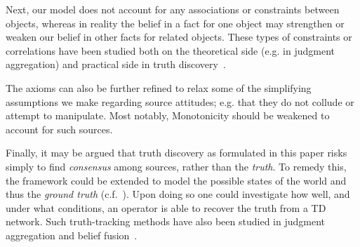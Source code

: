 Next, our model does not account for any associations or constraints between
objects, whereas in reality the belief in a fact for one object may strengthen
or weaken our belief in other facts for related objects. These types of
constraints or correlations have been studied both on the theoretical side
(e.g. in judgment aggregation) and practical side in truth
discovery~\cite{yang_probabilistic_2019}.

The axioms can also be further refined to relax some of the simplifying
assumptions we make regarding source attitudes; e.g. that they do not collude
or attempt to manipulate. Most notably, Monotonicity should be weakened to
account for such sources.

Finally, it may be argued that truth discovery as formulated in this paper
risks simply to find \emph{consensus} among sources, rather than the
\emph{truth}. To remedy this, the framework could be extended to model the
possible states of the world and thus the \emph{ground truth}
(c.f.~\cite{meir_proxy_2019}). Upon doing so one could investigate how well,
and under what conditions, an operator is able to recover the truth from a TD
network. Such truth-tracking methods have also been studied in judgment
aggregation and belief
fusion~\cite{everaere_epistemic_2010,hartmann_judgment_2012}.
